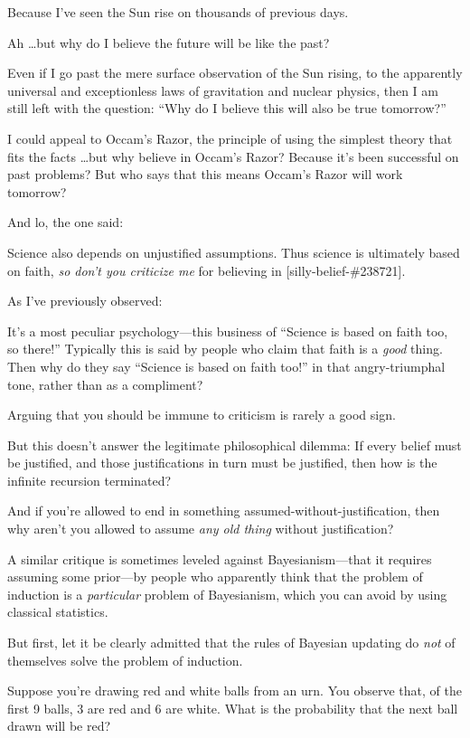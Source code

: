 {
 Because I've seen the Sun rise on thousands of
previous days.}

{
 Ah \ldots but why do I believe the future will be like the past?}

{
 Even if I go past the mere surface observation of the Sun rising,
to the apparently universal and exceptionless laws of gravitation and
nuclear physics, then I am still left with the question:
``Why do I believe this will also be true
tomorrow?''}

{
 I could appeal to Occam's Razor, the principle of
using the simplest theory that fits the facts \ldots but why believe in
Occam's Razor? Because it's been
successful on past problems? But who says that this means
Occam's Razor will work tomorrow?}

{
 And lo, the one said:}

{
 Science also depends on unjustified assumptions. Thus science is
ultimately based on faith, \textit{so don't you
criticize me} for believing in [silly-belief-\#238721].}

{
 As I've previously observed:}

{
 It's a most peculiar psychology---this business of
``Science is based on faith too, so
there!'' Typically this is said by people who claim
that faith is a \textit{good} thing. Then why do they say
``Science is based on faith too!''
in that angry-triumphal tone, rather than as a compliment?}

{
 Arguing that you should be immune to criticism is rarely a good
sign.}

{
 But this doesn't answer the legitimate
philosophical dilemma: If every belief must be justified, and those
justifications in turn must be justified, then how is the infinite
recursion terminated?}

{
 And if you're allowed to end in something
assumed-without-justification, then why aren't you
allowed to assume \textit{any old thing} without justification?}

{
 A similar critique is sometimes leveled against Bayesianism---that
it requires assuming some prior---by people who apparently think that
the problem of induction is a \textit{particular} problem of
Bayesianism, which you can avoid by using classical statistics.}

{
 But first, let it be clearly admitted that the rules of Bayesian
updating do \textit{not} of themselves solve the problem of induction.}

{
 Suppose you're drawing red and white balls from an
urn. You observe that, of the first 9 balls, 3 are red and 6 are white.
What is the probability that the next ball drawn will be red?}

